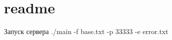 \chapter{readme}
\hypertarget{md__e_1_2_users_21_2_desktop_2_anton__cpp_2server-main_2readme}{}\label{md__e_1_2_users_21_2_desktop_2_anton__cpp_2server-main_2readme}
Запуск сервера ./main -\/f base.\+txt -\/p 33333 -\/e error.\+txt 